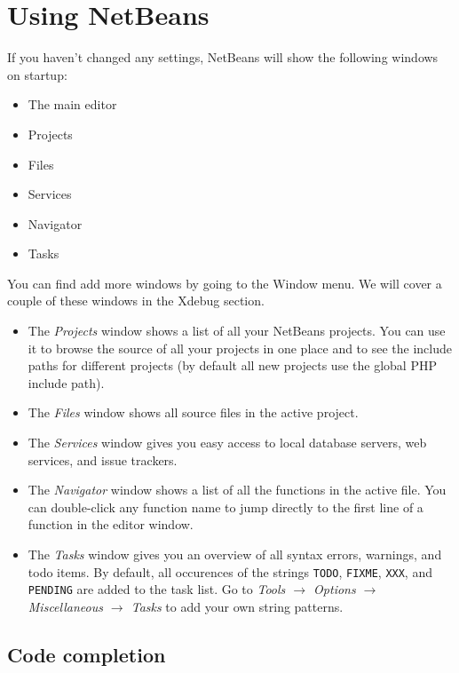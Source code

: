 \documentclass[draft,ebook,10pt,twoside,openright]{memoir}
\begin{document}
\chapter{Using NetBeans} \label{chusingnetbeans}
\chapterprecis{}

If you haven’t changed any settings, NetBeans will show the following windows on startup:


\begin{itemize}
\item The main editor
\item Projects
\item Files
\item Services
\item Navigator
\item Tasks
\end{itemize}

You can find add more windows by going to the Window menu. We will cover a couple of these windows in the Xdebug section.

\begin{itemize}
\item The \emph{Projects} window shows a list of all your NetBeans projects. You can use it to browse the source of all your projects in one place and to see the include paths for different projects (by default all new projects use the global PHP include path).
\item The \emph{Files} window shows all source files in the active project.
\item The \emph{Services} window gives you easy access to local database servers, web services, and issue trackers.
\item The \emph{Navigator} window shows a list of all the functions in the active file. You can double-click any function name to jump directly to the first line of a function in the editor window.
\item The \emph{Tasks} window gives you an overview of all syntax errors, warnings, and todo items. By default, all occurences of the strings \verb!TODO!, \verb!FIXME!, \verb!XXX!, and \verb!PENDING! are added to the task list. Go to \emph{Tools $\rightarrow$ Options $\rightarrow$ Miscellaneous $\rightarrow$ Tasks} to add your own string patterns.
\end{itemize}

\section{Code completion}
\end{document}
